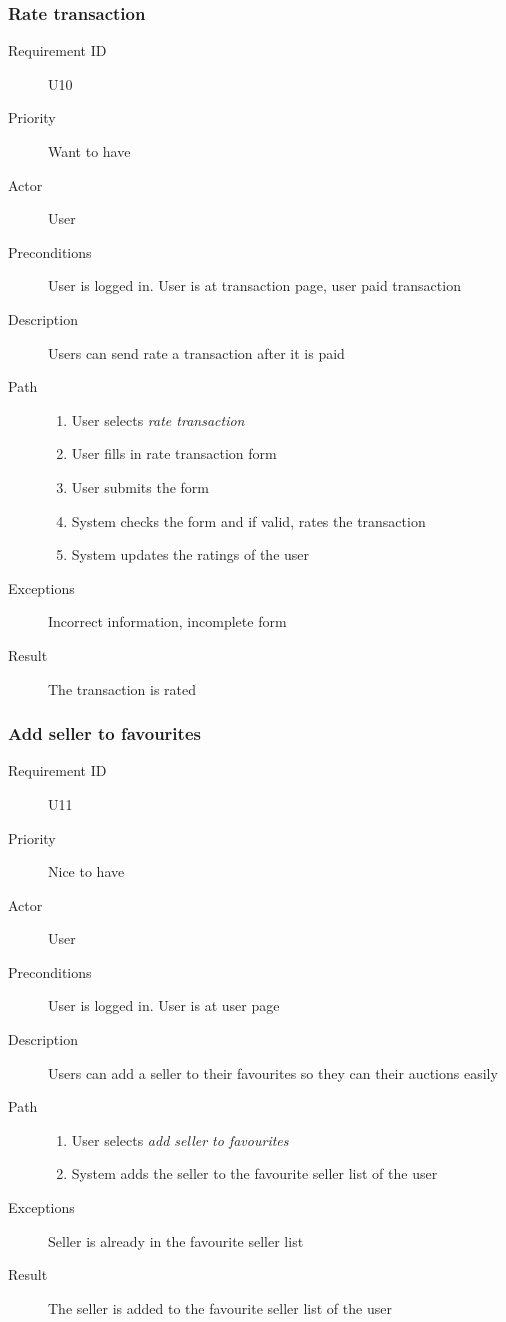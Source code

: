 		\subsubsection{Rate transaction}
			\begin{description}
				\item[Requirement ID] U10
				\item[Priority] Want to have
				\item[Actor] User
				\item[Preconditions] User is logged in. User is at transaction page, user paid transaction
				\item[Description] Users can send rate a transaction after it is paid
				\item[Path]
 					\begin{enumerate}
						\item User selects \emph{rate transaction}
						\item User fills in rate transaction form
						\item User submits the form
						\item System checks the form and if valid, rates the transaction
						\item System updates the ratings of the user
					\end{enumerate}
				\item[Exceptions] Incorrect information, incomplete form
				\item[Result] The transaction is rated
			\end{description}
		\subsubsection{Add seller to favourites}
			\begin{description}
				\item[Requirement ID] U11
				\item[Priority] Nice to have
				\item[Actor] User
				\item[Preconditions] User is logged in. User is at user page
				\item[Description] Users can add a seller to their favourites so they can their auctions easily
				\item[Path]
 					\begin{enumerate}
						\item User selects \emph{add seller to favourites}
						\item System adds the seller to the favourite seller list of the user
					\end{enumerate}
				\item[Exceptions] Seller is already in the favourite seller list
				\item[Result] The seller is added to the favourite seller list of the user
			\end{description}

